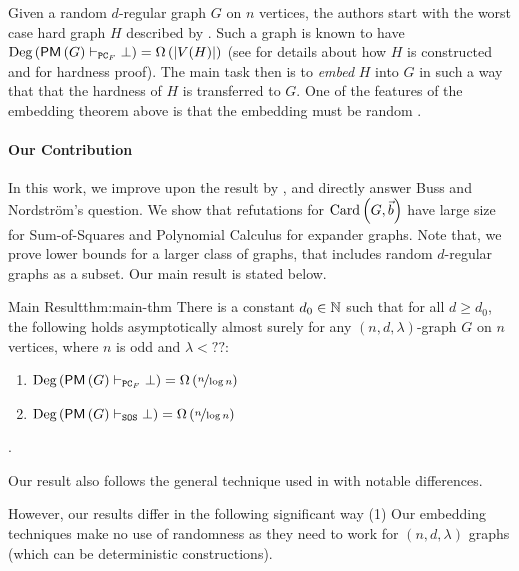 \documentclass[11pt]{article}
\newcommand{\Degree}[1]{\text{Deg}\left(#1\right)}
\newcommand{\PerfectMatching}[1]{\mathsf{PM}\left(#1\right)}
\newcommand{\PC}{\vdash_{\texttt{PC}_F}}
\newcommand{\SOS}{\vdash_{\texttt{SOS}}}
\newcommand{\EnDeeLambda}{(n, d, \lambda)}
\begin{document}
Given a random $d$-regular graph $G$ on $n$ vertices, the authors start with the worst case hard graph $H$ described by \citet{buss1999linear}.
Such a graph is known to have $\Degree{\PerfectMatching{G} \PC \bot} = \BigOmega{\Size{V(H)}}$ (see \citep[Appendix A]{Austrin_2022} for details about how $H$ is constructed and \citet{buss1999linear} for hardness proof).
The main task then is to \emph{embed} $H$ into $G$ in such a way that that the hardness of $H$ is transferred to $G$.
One of the features of the embedding theorem above is that the embedding must be random \citep[See Section 6]{Austrin_2022}.

\paragraph{Our Contribution} In this work, we improve upon the result by \citet{Austrin_2022}, and directly answer Buss and Nordstr{\"o}m's question. 
We show that refutations for $\text{Card}\left(G, \vec{b}\right)$ have large size for Sum-of-Squares and Polynomial Calculus for expander graphs.
Note that, we prove lower bounds for a larger class of graphs, that includes random $d$-regular graphs as a subset.
Our main result is stated below.

\begin{theorem}{Main Result}{thm:main-thm}
There is a constant $d_0 \in \mathbb{N}$ such that for all $d \geq d_0$, the following holds asymptotically almost surely for any $(n, d, \lambda)$-graph $G$ on $n$ vertices, where $n$ is odd and $\lambda < ??$:
\begin{enumerate}
    \item{ $\Degree{\PerfectMatching{G} \PC \bot} = \BigOmega{\nicefrac{n}{\log n}}$} 
    \item{$\Degree{\PerfectMatching{G} \SOS \bot} = \BigOmega{\nicefrac{n}{\log n}}$}
\end{enumerate}

.

\end{theorem}


Our result also follows the general technique used in \citep{Austrin_2022} with notable differences.

However, our results differ in the following significant way 
(1) Our embedding techniques make no use of randomness as they need to work for $\EnDeeLambda$ graphs (which can be deterministic constructions).
\end{document}

